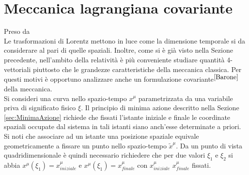 \section{Meccanica lagrangiana covariante}Preso da \cite{Barone}\\
Le trasformazioni di Lorentz mettono in luce come la dimensione temporale si da considerare al pari di quelle spaziali. Inoltre, come si è già visto nella Sezione precedente, nell'ambito della relatività è più conveniente studiare quantità 4-vettoriali piuttosto che le grandezze caratteristiche della meccanica classica. Per questi motivi è opportuno analizzare anche un formulazione covariante$^{\cite{Barone}}$ della meccanica.\\

Si consideri una curva nello spazio-tempo $x^\mu$ parametrizzata da una variabile priva di significato fisico $\xi$. Il principio di minima azione descritto nella Sezione \ref{sec:MinimaAzione} richiede che fissati l'istante iniziale e finale le coordinate spaziali occupate dal sistema in tali istanti siano anch'esse determinate a priori. Si noti che associare ad un istante una posizione spaziale equivale geometricamente a fissare un punto nello spazio-tempo $\tilde{x}^\mu$. Da un punto di vista quadridimensionale è quindi necessario richiedere che per due valori $\xi_1$ e $\xi_2$ si abbia $x^\mu(\xi_1)=x^\mu_{iniziale}$ e $x^\mu(\xi_1)=x^\mu_{finale}$ con $x^\mu_{iniziale}$ $x^\mu_{finale}$ fissati.\\



